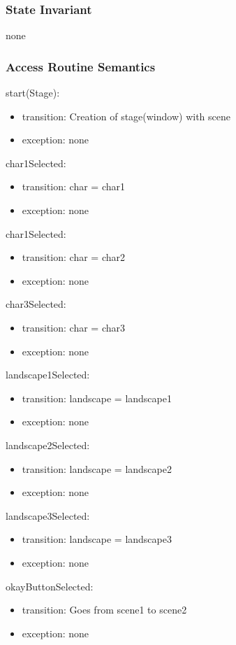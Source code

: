 \documentclass[12pt, titlepage]{article}
\begin{document}
\subsubsection {State Invariant}
none
\subsubsection {Access Routine Semantics}
start(Stage):
\begin{itemize}
\item transition: Creation of stage(window) with scene
\item exception: none
\end{itemize}
char1Selected:
\begin{itemize}
\item transition: char = char1
\item exception: none
\end{itemize}
char1Selected:
\begin{itemize}
\item transition: char = char2
\item exception: none
\end{itemize}
char3Selected:
\begin{itemize}
\item transition: char = char3
\item exception: none
\end{itemize}
landscape1Selected:
\begin{itemize}
\item transition: landscape = landscape1
\item exception: none
\end{itemize}
landscape2Selected:
\begin{itemize}
\item transition: landscape = landscape2
\item exception: none
\end{itemize}
landscape3Selected:
\begin{itemize}
\item transition: landscape = landscape3
\item exception: none
\end{itemize}
okayButtonSelected:
\begin{itemize}
\item transition: Goes from scene1 to scene2
\item exception: none
\end{itemize}
\end{document}
